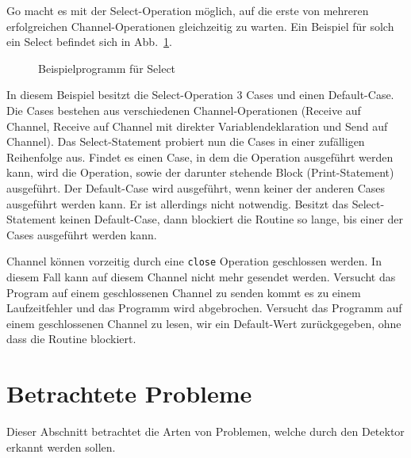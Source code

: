 Go macht es mit der Select-Operation möglich, auf die erste von mehreren 
erfolgreichen Channel-Operationen gleichzeitig zu warten. Ein Beispiel für solch 
ein Select befindet sich in Abb.~\ref{Chan:Analyze-Sec:Channel-Fig:SelectEx}.
\begin{figure}[h!]
  
  \caption{Beispielprogramm für Select}
  \label{Chan:Analyze-Sec:Channel-Fig:SelectEx}
\end{figure}
In diesem Beispiel besitzt die Select-Operation 3 Cases und einen Default-Case.
Die Cases bestehen aus verschiedenen Channel-Operationen (Receive auf Channel, 
Receive auf Channel mit direkter Variablendeklaration und Send auf Channel).
Das Select-Statement probiert nun die Cases in einer zufälligen Reihenfolge 
aus. Findet es einen Case, in dem die Operation ausgeführt werden kann, wird 
die Operation, sowie der darunter stehende Block (Print-Statement) ausgeführt.
Der Default-Case wird ausgeführt, wenn keiner der anderen Cases ausgeführt 
werden kann. Er ist allerdings nicht notwendig. Besitzt das Select-Statement 
keinen Default-Case, dann blockiert die Routine so lange, bis einer der Cases 
ausgeführt werden kann.

Channel können vorzeitig durch eine \texttt{close} Operation geschlossen werden.
In diesem Fall kann auf diesem Channel nicht mehr gesendet werden. Versucht 
das Program auf einem geschlossenen Channel zu senden kommt es zu einem 
Laufzeitfehler und das Programm wird abgebrochen. Versucht das Programm 
auf einem geschlossenen Channel zu lesen, wir ein Default-Wert zurückgegeben,
ohne dass die Routine blockiert.

\section{Betrachtete Probleme}\label{chap:background-sec:Prob}
Dieser Abschnitt betrachtet die Arten von Problemen, welche durch den Detektor 
erkannt werden sollen. 


